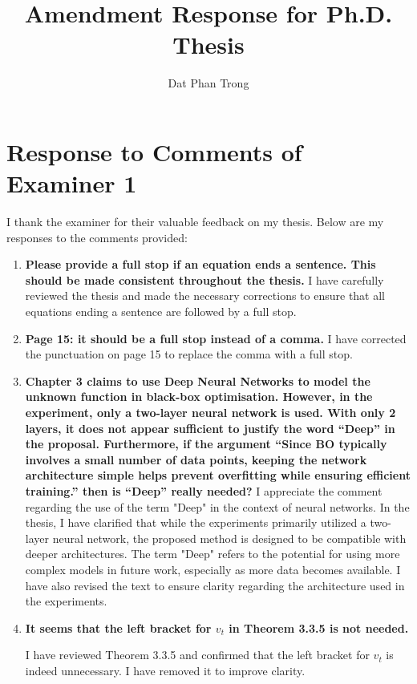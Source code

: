 \documentclass[12pt]{article}
\title{Amendment Response for Ph.D. Thesis}
\author{Dat Phan Trong}
\date{}
\begin{document}
\maketitle

\section*{Response to Comments of Examiner 1}
I thank the examiner for their valuable feedback on my thesis. Below are my responses to the comments provided:
\begin{enumerate}[leftmargin=0pt, label={\textbf{\arabic*.}}, itemsep=2em]

    \item \textbf{Please provide a full stop if an equation ends a sentence. This should be made consistent throughout the thesis.}
    I have carefully reviewed the thesis and made the necessary corrections to ensure that all equations ending a sentence are followed by a full stop.

    \item \textbf{Page 15: it should be a full stop instead of a comma.}
    I have corrected the punctuation on page 15 to replace the comma with a full stop.

    
    \item \textbf{Chapter 3 claims to use Deep Neural Networks to model the unknown function in black-box optimisation. However, in the experiment, only a two-layer neural network is used. With only 2 layers, it does not appear sufficient to justify the word ``Deep'' in the proposal. Furthermore, if the argument ``Since BO typically involves a small number of data points, keeping the network architecture simple helps prevent overfitting while ensuring efficient training.'' then is ``Deep'' really needed?}    
    I appreciate the comment regarding the use of the term "Deep" in the context of neural networks. In the thesis, I have clarified that while the experiments primarily utilized a two-layer neural network, the proposed method is designed to be compatible with deeper architectures. The term "Deep" refers to the potential for using more complex models in future work, especially as more data becomes available. I have also revised the text to ensure clarity regarding the architecture used in the experiments.

    \item \textbf{It seems that the left bracket for $v_t$ in Theorem 3.3.5 is not needed.}
    
    I have reviewed Theorem 3.3.5 and confirmed that the left bracket for $v_t$ is indeed unnecessary. I have removed it to improve clarity.


\end{enumerate}
\end{document}

